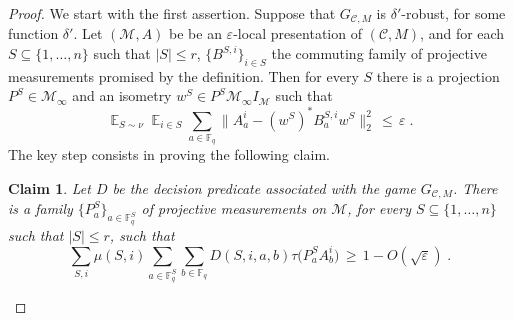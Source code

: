 \documentclass[11pt]{article}
\newtheorem{claim}[theorem]{Claim}
\theoremstyle{definition}
\newcommand{\code}{\mathcal{C}}
\DeclareMathOperator*{\Expectation}{\mathbb{E}}
\newcommand{\Es}[1]{\Expectation_{#1}}
\newcommand{\F}{\ensuremath{\mathbb{F}}}
\newcommand{\mM}{\ensuremath{\mathcal{M}}}
\newcommand{\eps}{\varepsilon}
\begin{document}
\begin{proof}
We start with the first assertion. Suppose that $G_{\code,M}$ is $\delta'$-robust, for some function $\delta'$. Let $(\mM,A)$ be be an $\eps$-local presentation of $(\code,M)$, and for each $S\subseteq\{1,\ldots,n\}$ such that $|S| \leq r$, $\{B^{S,i}\}_{i\in S}$ the commuting family of projective measurements promised by the definition. Then for every $S$ there is a projection $P^S \in \mM_\infty$ and an isometry $w^S\in P^S \mM_\infty I_\mM$ such that 
\[ \Es{S \sim \nu} \Es{i\in S} \sum_{a \in \F_q} \big\| A^i_a - (w^S)^* B^{S,i}_{a}w^S \big\|_2^2 \,\leq\,\eps\;.\]
The key step consists in proving the following claim. 

\begin{claim}\label{claim:sound-game-1}
Let $D$ be the decision predicate associated with the game $G_{\code,M}$.
There is a family  $\{P^S_a\}_{a\in \F_q^S}$  of projective measurements on $\mM$, for every  $S\subseteq\{1,\ldots,n\}$ such that $|S| \leq r$, such that
\begin{equation}
 \sum_{S,i} \mu(S,i) \sum_{a\in \F^S_q}\sum_{b\in\F_q} D(S,i,a,b) \tau\big(  P^S_a  A^i_{b}\big) \,\geq \,1-O(\sqrt{\eps})\;.\label{eq:s-g-4}
\end{equation}
\end{claim}


\end{proof}
\end{document}

